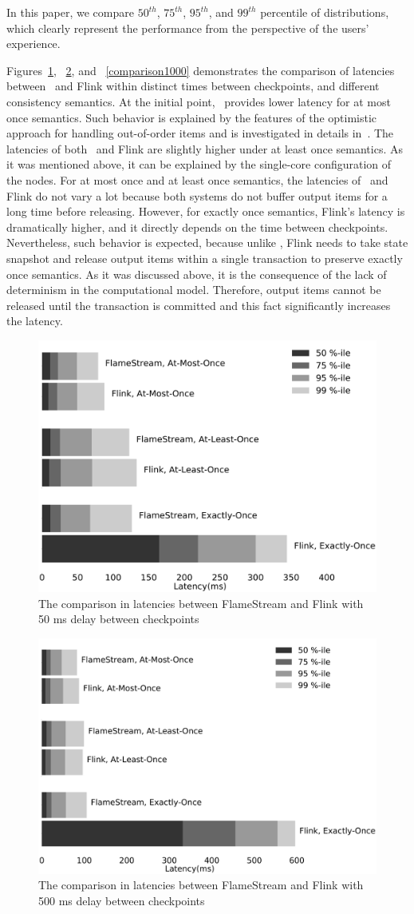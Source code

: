 In this paper, we compare $50^{th}$, $75^{th}$, $95^{th}$, and $99^{th}$ percentile of distributions, which clearly represent the performance from the perspective of the users' experience.

Figures~\ref{comparison50}, ~\ref{comparison500}, and ~\ref{comparison1000} demonstrates the comparison of latencies between \FlameStream\ and Flink within distinct times between checkpoints, and different consistency semantics. At the initial point, \FlameStream\ provides lower latency for at most once semantics. Such behavior is explained by the features of the optimistic approach for handling out-of-order items and is investigated in details in~\cite{we2018seim}. The latencies of both \FlameStream\ and Flink are slightly higher under at least once semantics. As it was mentioned above, it can be explained by the single-core configuration of the nodes. For at most once and at least once semantics, the latencies of \FlameStream\ and Flink do not vary a lot because both systems do not buffer output items for a long time before releasing. However, for exactly once semantics, Flink's latency is dramatically higher, and it directly depends on the time between checkpoints. Nevertheless, such behavior is expected, because unlike \FlameStream, Flink needs to take state snapshot and release output items within a single transaction to preserve exactly once semantics. As it was discussed above, it is the consequence of the lack of determinism in the computational model. Therefore, output items cannot be released until the transaction is committed and this fact significantly increases the latency. 

\begin{figure}[htbp]
  \centering
  \includegraphics[width=.5\textwidth]{pics/comparison50}
  \caption{The comparison in latencies between FlameStream and Flink with 50 ms delay between checkpoints}
  \label {comparison50}
\end{figure}

\begin{figure}[htbp]
  \centering
  \includegraphics[width=.5\textwidth]{pics/comparison500}
  \caption{The comparison in latencies between FlameStream and Flink with 500 ms delay between checkpoints}
  \label {comparison500}
\end{figure}

